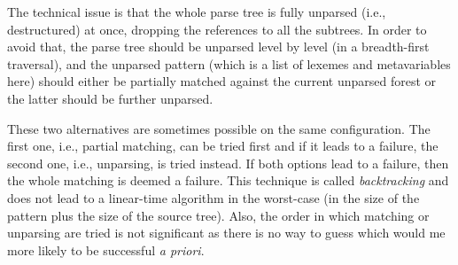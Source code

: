 The technical issue is that the whole parse tree is fully unparsed
(i.e., de\-structured) at once, dropping the references to all the
subtrees. In order to avoid that, the parse tree should be unparsed
level by level (in a breadth\hyp{}first traversal), and the unparsed
pattern (which is a list of lexemes and meta\-variables here) should
either be partially matched against the current unparsed forest or the
latter should be further unparsed.

These two alternatives are sometimes possible on the same
configuration. The first one, i.e., partial matching, can be tried
first and if it leads to a failure, the second one, i.e., unparsing,
is tried instead. If both options lead to a failure, then the whole
matching is deemed a failure. This technique is called
\emph{backtracking} and does not lead to a linear\hyp{}time algorithm
in the worst\hyp{}case (in the size of the pattern plus the size of
the source tree). Also, the order in which matching or unparsing are
tried is not significant as there is no way to guess which would me
more likely to be successful \emph{a priori}.

